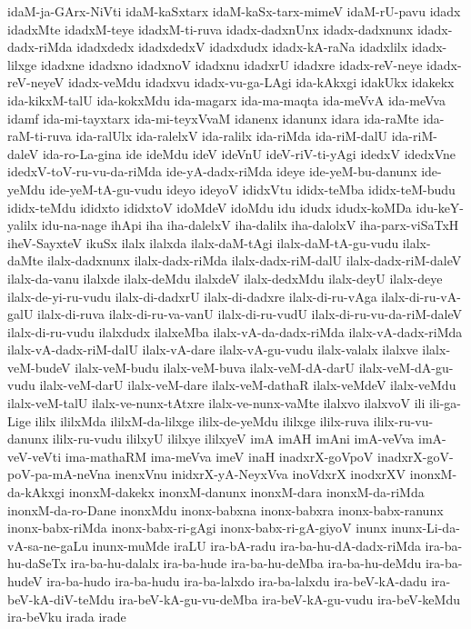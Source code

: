 {idaM-ja-GArx-NiVti
idaM-kaSxtarx
idaM-kaSx-tarx-mimeV
idaM-rU-pavu
idadx
idadxMte
idadxM-teye
idadxM-ti-ruva
idadx-dadxnUnx
idadx-dadxnunx
idadx-dadx-riMda
idadxdedx
idadxdedxV
idadxdudx
idadx-kA-raNa
idadxlilx
idadx-lilxge
idadxne
idadxno
idadxnoV
idadxnu
idadxrU
idadxre
idadx-reV-neye
idadx-reV-neyeV
idadx-veMdu
idadxvu
idadx-vu-ga-LAgi
ida-kAkxgi
idakUkx
idakekx
ida-kikxM-talU
ida-kokxMdu
ida-magarx
ida-ma-maqta
ida-meVvA
ida-meVva
idamf
ida-mi-tayxtarx
ida-mi-teyxVvaM
idanenx
idanunx
idara
ida-raMte
ida-raM-ti-ruva
ida-ralUlx
ida-ralelxV
ida-ralilx
ida-riMda
ida-riM-dalU
ida-riM-daleV
ida-ro-La-gina
ide
ideMdu
ideV
ideVnU
ideV-riV-ti-yAgi
idedxV
idedxVne
idedxV-toV-ru-vu-da-riMda
ide-yA-dadx-riMda
ideye
ide-yeM-bu-danunx
ide-yeMdu
ide-yeM-tA-gu-vudu
ideyo
ideyoV
ididxVtu
ididx-teMba
ididx-teM-budu
ididx-teMdu
ididxto
ididxtoV
idoMdeV
idoMdu
idu
idudx
idudx-koMDa
idu-keY-yalilx
idu-na-nage
ihApi
iha
iha-dalelxV
iha-dalilx
iha-dalolxV
iha-parx-viSaTxH
iheV-SayxteV
ikuSx
ilalx
ilalxda
ilalx-daM-tAgi
ilalx-daM-tA-gu-vudu
ilalx-daMte
ilalx-dadxnunx
ilalx-dadx-riMda
ilalx-dadx-riM-dalU
ilalx-dadx-riM-daleV
ilalx-da-vanu
ilalxde
ilalx-deMdu
ilalxdeV
ilalx-dedxMdu
ilalx-deyU
ilalx-deye
ilalx-de-yi-ru-vudu
ilalx-di-dadxrU
ilalx-di-dadxre
ilalx-di-ru-vAga
ilalx-di-ru-vA-galU
ilalx-di-ruva
ilalx-di-ru-va-vanU
ilalx-di-ru-vudU
ilalx-di-ru-vu-da-riM-daleV
ilalx-di-ru-vudu
ilalxdudx
ilalxeMba
ilalx-vA-da-dadx-riMda
ilalx-vA-dadx-riMda
ilalx-vA-dadx-riM-dalU
ilalx-vA-dare
ilalx-vA-gu-vudu
ilalx-valalx
ilalxve
ilalx-veM-budeV
ilalx-veM-budu
ilalx-veM-buva
ilalx-veM-dA-darU
ilalx-veM-dA-gu-vudu
ilalx-veM-darU
ilalx-veM-dare
ilalx-veM-dathaR
ilalx-veMdeV
ilalx-veMdu
ilalx-veM-talU
ilalx-ve-nunx-tAtxre
ilalx-ve-nunx-vaMte
ilalxvo
ilalxvoV
ili
ili-ga-Lige
ililx
ililxMda
ililxM-da-lilxge
ililx-de-yeMdu
ililxge
ililx-ruva
ililx-ru-vu-danunx
ililx-ru-vudu
ililxyU
ililxye
ililxyeV
imA
imAH
imAni
imA-veVva
imA-veV-veVti
ima-mathaRM
ima-meVva
imeV
inaH
inadxrX-goVpoV
inadxrX-goV-poV-pa-mA-neVna
inenxVnu
inidxrX-yA-NeyxVva
inoVdxrX
inodxrXV
inonxM-da-kAkxgi
inonxM-dakekx
inonxM-danunx
inonxM-dara
inonxM-da-riMda
inonxM-da-ro-Dane
inonxMdu
inonx-babxna
inonx-babxra
inonx-babx-ranunx
inonx-babx-riMda
inonx-babx-ri-gAgi
inonx-babx-ri-gA-giyoV
inunx
inunx-Li-da-vA-sa-ne-gaLu
inunx-muMde
iraLU
ira-bA-radu
ira-ba-hu-dA-dadx-riMda
ira-ba-hu-daSeTx
ira-ba-hu-dalalx
ira-ba-hude
ira-ba-hu-deMba
ira-ba-hu-deMdu
ira-ba-hudeV
ira-ba-hudo
ira-ba-hudu
ira-ba-lalxdo
ira-ba-lalxdu
ira-beV-kA-dadu
ira-beV-kA-diV-teMdu
ira-beV-kA-gu-vu-deMba
ira-beV-kA-gu-vudu
ira-beV-keMdu
ira-beVku
irada
irade
}
